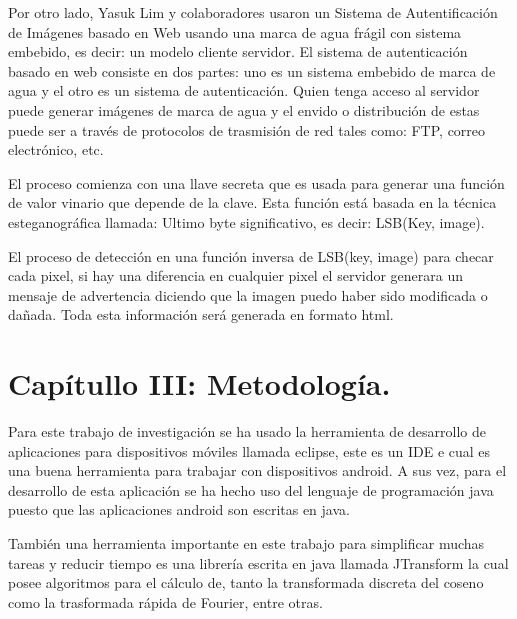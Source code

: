 \documentclass[12pt]{article}
\begin{document}
Por otro lado, Yasuk Lim y colaboradores usaron un Sistema de Autentificación de Imágenes basado en Web usando una marca de agua frágil  con sistema embebido, es decir: un modelo cliente servidor. El sistema  de autenticación basado en web consiste en dos partes: uno es un sistema embebido de marca de agua y el otro es un sistema de autenticación. Quien tenga acceso al servidor puede generar imágenes de marca de agua y el envido o distribución de estas puede ser a través de protocolos de trasmisión de red tales como: FTP,  correo electrónico, etc.

El proceso comienza con una llave secreta que es usada para generar una función de valor vinario que depende de la clave. Esta función está basada en la técnica esteganográfica llamada: Ultimo byte significativo, es decir: LSB(Key, image).

El proceso de detección en una función inversa de LSB(key, image) para checar cada pixel, si hay una diferencia en cualquier pixel el servidor generara un mensaje de advertencia diciendo que la imagen puedo haber sido modificada o dañada. Toda esta información será generada en formato html. \cite{Yusuk}


\section{Capítullo III: Metodología.}
Para este trabajo de investigación se ha usado la herramienta de desarrollo de aplicaciones para dispositivos móviles llamada eclipse, este es un IDE e cual es una buena herramienta para trabajar con dispositivos android. A sus vez, para el desarrollo de esta aplicación se ha hecho uso del lenguaje de programación java puesto que las aplicaciones android son escritas en java.

También una herramienta importante en este trabajo para simplificar muchas tareas y reducir tiempo es una librería escrita en java llamada JTransform la cual posee algoritmos para el cálculo de, tanto la  transformada discreta del coseno como la  trasformada rápida de Fourier, entre otras.
\end{document}
